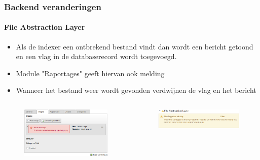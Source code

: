 \begin{frame}[fragile]
	\frametitle{Backend veranderingen}
	\framesubtitle{File Abstraction Layer}

	\begin{itemize}
		\item Als de indexer een ontbrekend bestand vindt dan wordt een bericht getoond en een vlag in de databaserecord wordt toegevoegd. 
		\item Module "Raportages" geeft hiervan ook melding
		\item Wanneer het bestand weer wordt gevonden verdwijnen de vlag en het bericht
	\end{itemize}

	\begin{columns}[T]

		\begin{column}{.5\textwidth}
			\begin{figure}
				\includegraphics[width=0.95\linewidth]{Images/BackendChanges/FalMissingFileContentElement.png}
			\end{figure}
		\end{column}

		\begin{column}{.5\textwidth}
			\begin{figure}
				\includegraphics[width=0.95\linewidth]{Images/BackendChanges/FalMissingFileReportsModule.png}
			\end{figure}
		\end{column}

	\end{columns}

\end{frame}

